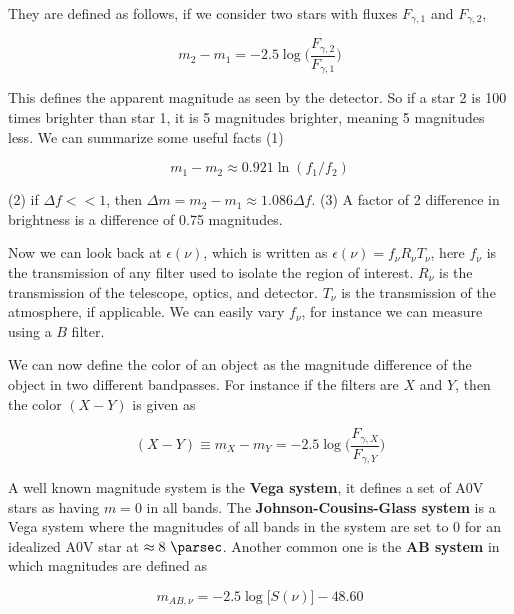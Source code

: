 \documentclass[a4paper]{article}
\begin{document}
They are defined as follows, if we consider two stars with fluxes $F_{\gamma, 1}$ and $F_{\gamma, 2}$,

\begin{equation}
    m_2-m_1=-2.5\log\bigg(\frac{F_{\gamma, 2}}{F_{\gamma, 1}}\bigg)
\end{equation}

This defines the apparent magnitude as seen by the detector. So if a star 2 is 100 times brighter than star 1, it is 5 magnitudes brighter, meaning 5 magnitudes less. We can summarize some useful facts (1)

\begin{equation}
    m_1-m_2\approx 0.921\ln(f_1/f_2)
\end{equation}

(2) if $\Delta f<< 1$, then $\Delta m=m_2-m_1\approx 1.086\Delta f$. (3) A factor of 2 difference in brightness is a difference of 0.75 magnitudes.

\bigskip

Now we can look back at $\epsilon(\nu)$, which is written as $\epsilon(\nu)=f_{\nu}R_{\nu}T_{\nu}$, here $f_{\nu}$ is the transmission of any filter used to isolate the region of interest. $R_{\nu}$ is the transmission of the telescope, optics, and detector. $T_{\nu}$ is the transmission of the atmosphere, if applicable. We can easily vary $f_\nu$, for instance we can measure using a $B$ filter.

\bigskip

We can now define the color of an object as the magnitude difference of the object in two different bandpasses. For instance if the filters are $X$ and $Y$, then the color $(X-Y)$ is given as

\begin{equation}
    (X-Y)\equiv m_X-m_Y=-2.5\log\bigg(\frac{F_{\gamma, X}}{F_{\gamma, Y}}\bigg)
\end{equation}

A well known magnitude system is the \textbf{Vega system}, it defines a set of A0V stars as having $m=0$ in all bands. The \textbf{Johnson-Cousins-Glass system} is a Vega system where the magnitudes of all bands in the system are set to 0 for an idealized A0V star at $\approx 8 \ \si{\parsec}$. Another common one is the \textbf{AB system} in which magnitudes are defined as

\begin{equation}
    m_{AB, \nu}=-2.5\log\big[S(\nu)\big]-48.60
\end{equation}
\end{document}
